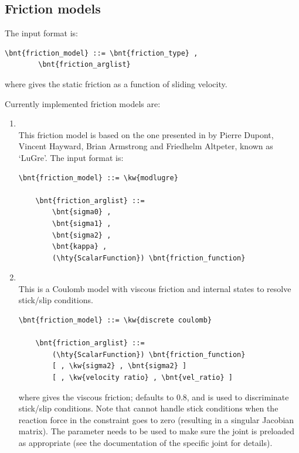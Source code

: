 \subsection{Friction models}
\label{sec:friction model}
The  input format is:
\begin{Verbatim}[commandchars=\\\{\}]
    \bnt{friction_model} ::= \bnt{friction_type} ,
        \bnt{friction_arglist}
\end{Verbatim}
where  gives the static friction
as a function of sliding velocity.

Currently implemented friction models are:
\begin{enumerate}
\item {}\\
This friction model is based on the one presented in \cite{LUGRE-2002}
by Pierre Dupont, Vincent Hayward, Brian Armstrong and Friedhelm Altpeter,
known as `LuGre'.
The input format is:
\begin{Verbatim}[commandchars=\\\{\}]
    \bnt{friction_model} ::= \kw{modlugre}

    \bnt{friction_arglist} ::=
        \bnt{sigma0} ,
        \bnt{sigma1} ,
        \bnt{sigma2} ,
        \bnt{kappa} ,
        (\hty{ScalarFunction}) \bnt{friction_function}
\end{Verbatim}

    \item {}\\
    This is a Coulomb model with viscous friction and
    internal states to resolve stick/slip conditions.
\begin{Verbatim}[commandchars=\\\{\}]
    \bnt{friction_model} ::= \kw{discrete coulomb}

    \bnt{friction_arglist} ::=
        (\hty{ScalarFunction}) \bnt{friction_function}
        [ , \kw{sigma2} , \bnt{sigma2} ]
        [ , \kw{velocity ratio} , \bnt{vel_ratio} ]
\end{Verbatim}
    where  gives the viscous friction;
     defaults to 0.8, and is used
    to discriminate stick/slip conditions.
    Note that 
    cannot handle stick conditions when the reaction force
    in the constraint goes to zero (resulting in a singular Jacobian matrix).
    The  parameter needs to be used to make sure
    the joint is preloaded as appropriate
    (see the documentation of the specific joint for details).
\end{enumerate}

